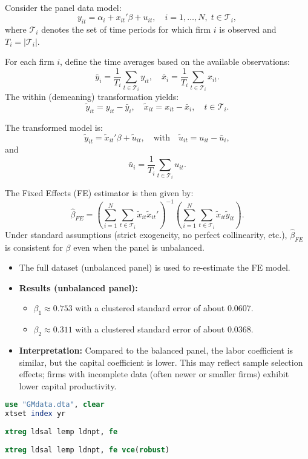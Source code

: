 \documentclass[a4paper,12pt]{article} %
\theoremstyle{nonitalic}
\newenvironment{solution}[1]
  {\renewcommand\theinnercustomsol{#1}\innercustomsol}
  {\endinnercustomsol}
\newcounter{solutionctr}
\renewcommand{\thesolutionctr}{(\alph{solutionctr})}
\newenvironment{autosolution}
  {\stepcounter{solutionctr}\begin{solution}{\thesolutionctr}}
  {\end{solution}}
\begin{document}
\begin{autosolution}
\

Consider the panel data model:
\[
y_{it} = \alpha_i + x_{it}'\beta + u_{it}, \quad i=1,\dots,N,\; t\in \mathcal{T}_i,
\]
where \( \mathcal{T}_i \) denotes the set of time periods for which firm \( i \) is observed and \( T_i = |\mathcal{T}_i| \).

For each firm \( i \), define the time averages based on the available observations:
\[
\bar{y}_i = \frac{1}{T_i}\sum_{t\in \mathcal{T}_i} y_{it}, \quad \bar{x}_i = \frac{1}{T_i}\sum_{t\in \mathcal{T}_i} x_{it}.
\]
The within (demeaning) transformation yields:
\[
\tilde{y}_{it} = y_{it} - \bar{y}_i, \quad \tilde{x}_{it} = x_{it} - \bar{x}_i, \quad t\in \mathcal{T}_i.
\]

The transformed model is:
\[
\tilde{y}_{it} = \tilde{x}_{it}'\beta + \tilde{u}_{it}, \quad \text{with} \quad \tilde{u}_{it} = u_{it} - \bar{u}_i,
\]
and
\[
\bar{u}_i = \frac{1}{T_i}\sum_{t\in \mathcal{T}_i} u_{it}.
\]

The Fixed Effects (FE) estimator is then given by:
\[
\hat{\beta}_{FE} = \left( \sum_{i=1}^{N}\sum_{t\in \mathcal{T}_i} \tilde{x}_{it}\tilde{x}_{it}' \right)^{-1} \left( \sum_{i=1}^{N}\sum_{t\in \mathcal{T}_i} \tilde{x}_{it}\tilde{y}_{it} \right).
\]
Under standard assumptions (strict exogeneity, no perfect collinearity, etc.), \(\hat{\beta}_{FE}\) is consistent for \(\beta\) even when the panel is unbalanced.

\begin{itemize}
    \item The full dataset (unbalanced panel) is used to re-estimate the FE model.
    \item \textbf{Results (unbalanced panel):}
    
    \begin{itemize}
        \item \(\beta_1 \approx 0.753\) with a clustered standard error of about 0.0607.
        \item \(\beta_2 \approx 0.311\) with a clustered standard error of about 0.0368.
    \end{itemize}
    \item \textbf{Interpretation:} Compared to the balanced panel, the labor coefficient is similar, but the capital coefficient is lower. This may reflect sample selection effects; firms with incomplete data (often newer or smaller firms) exhibit lower capital productivity.
\end{itemize}

\begin{lstlisting}[language=stata]
use "GMdata.dta", clear
xtset index yr
    
xtreg ldsal lemp ldnpt, fe
    
xtreg ldsal lemp ldnpt, fe vce(robust)
    
\end{lstlisting}
\end{autosolution}
\end{document}
